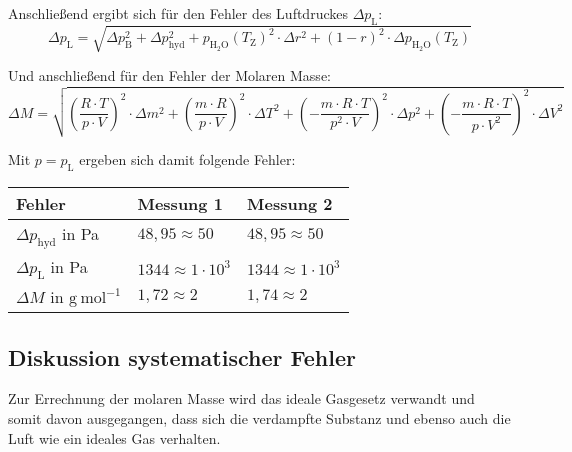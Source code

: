 \documentclass[12pt,a4paper,titlepage,headinclude,bibtotoc]{scrartcl}
\begin{document}
Anschließend ergibt sich für den Fehler des Luftdruckes $\Delta p_\mathrm{L}$:\\


\begin{equation}
\Delta p_\mathrm{L} = \sqrt{\Delta p_\mathrm{B}^2 + \Delta p_\mathrm{hyd}^2 + p_\mathrm{H_2O}(T_\mathrm{Z})^2 \cdot \Delta r^2 + (1-r)^2 \cdot \Delta p_\mathrm{H_2O}(T_\mathrm{Z})}
\end{equation}

Und anschließend für den Fehler der Molaren Masse:\\

\begin{equation}
\Delta M = \sqrt{\left(\frac{R\cdot T}{p\cdot V}\right)^2 \cdot \Delta m^2 + \left(\frac{m\cdot R}{p\cdot V} \right)^2 \cdot \Delta T^2 + \left(-\frac{m\cdot R\cdot T}{p^2 \cdot V}\right)^2 \cdot \Delta p^2 + \left(-\frac{m \cdot R \cdot T}{p \cdot V^2} \right)^2 \cdot \Delta V^2}
\end{equation}

Mit $p = p_\mathrm{L}$ ergeben sich damit folgende Fehler:\\

\begin{table} [h]
\centering
\begin{tabular}{|p{4 cm}||p{4 cm}|p{4 cm}|}
        \hline
		Fehler & Messung 1 & Messung 2\\
         \hline 
        $\Delta p_\mathrm{hyd}$ in Pa & $48,95 \approx 50$  & $48,95 \approx 50$ \\
        \hline
        $\Delta p_\mathrm{L}   $ in Pa & $1344 \approx 1 \cdot 10^3$  & $1344 \approx 1 \cdot 10^3$ \\
        \hline
        $\Delta M $ in $\mathrm{g{~}mol^{-1}}$ & $1,72 \approx 2$ & $1,74 \approx 2$ \\
        \hline     
\end{tabular}
\end{table}




\subsection{Diskussion systematischer Fehler}

Zur Errechnung der molaren Masse wird das ideale Gasgesetz verwandt und somit davon ausgegangen, dass sich die verdampfte Substanz und ebenso auch die Luft wie ein ideales Gas verhalten. \\
\end{document}
